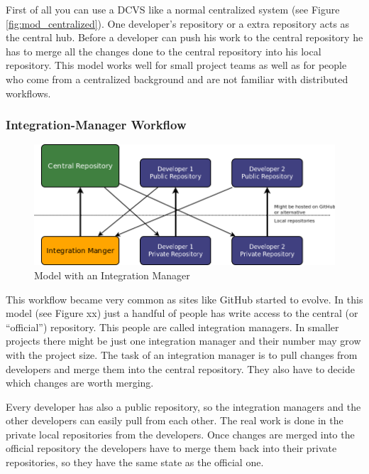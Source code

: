 First of all you can use a DCVS like a normal centralized system (see Figure \ref{fig:mod_centralized}). One developer's repository or a extra repository acts as the central hub. Before a developer can push his work to the central repository he has to merge all the changes done to the central repository into his local repository. This model works well for small project teams as well as for people who come from a centralized background and are not familiar with distributed workflows.


\subsubsection{Integration-Manager Workflow}

\begin{figure}[tbp]
  \centering
  \includegraphics[width=\textwidth]{img/Mod_IntegrationManager}
  \caption{Model with an Integration Manager}
  \label{fig:mod_intMan} 
\end{figure}

This workflow became very common as sites like GitHub started to evolve. In
this model (see Figure xx) just a handful of people has write access to the central (or “official”) repository. 
This people are called integration managers. In smaller projects there might be just one integration manager and their 
number may grow with the project size. The task of an integration manager is to pull changes from developers and merge 
them into the central repository. They also have to decide which changes are worth merging.

Every developer has also a public repository, so the integration managers and the other developers can easily pull from 
each other. The real work is done in the private local repositories from the developers. Once changes are merged into the 
official repository the developers have to merge them back into their private repositories, so they have the same state as the official one.

